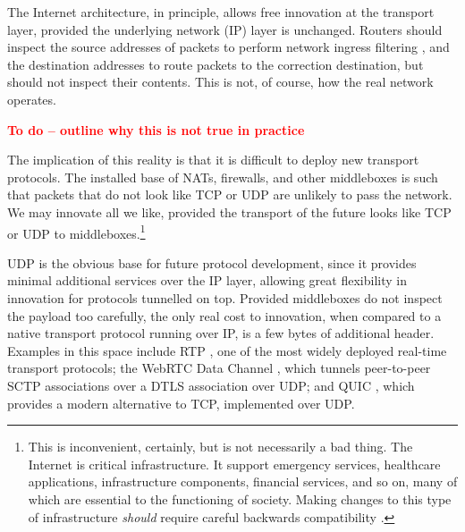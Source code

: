 \documentclass{sig-alternate-05-2015}
\newcommand{\todo}[1]{\textbf{\textcolor{red}{To do -- #1}}}
\begin{document}
The Internet architecture, in principle, allows free innovation at the
transport layer, provided the underlying network (IP) layer is unchanged.  
Routers should inspect the source addresses of packets to perform network
ingress filtering \cite{rfc:2827}, and the destination addresses to route
packets to the correction destination, but should not inspect their
contents. This is not, of course, how the real network operates. 

\todo{outline why this is not true in practice}

The implication of this reality is that it is difficult to deploy new 
transport protocols. The installed base of NATs, firewalls, and other
middleboxes is such that packets that do not look like TCP or UDP are
unlikely to pass the network. We may innovate all we like, provided the
transport of the future looks like TCP or UDP to middleboxes.\footnote{
  This is inconvenient, certainly, but is not necessarily a bad thing. 
  The Internet is critical infrastructure. It support emergency services, 
  healthcare applications, infrastructure components, financial services, 
  and so on, many of which are essential to the functioning of society. 
  Making changes to this type of infrastructure \emph{should} require 
  careful backwards compatibility \cite{mcquistin:2015:reinterpreting}.
}

UDP is the obvious base for future protocol development, since it provides
minimal additional services over the IP layer, allowing great flexibility
in innovation for protocols tunnelled on top. Provided middleboxes do not
inspect the payload too carefully, the only real cost to innovation, when
compared to a native transport protocol running over IP, is a few bytes of
additional header. Examples in this space include RTP \cite{rfc:3550}, one
of the most widely deployed real-time transport protocols; the WebRTC Data
Channel \cite{draft-ietf-rtcweb-data-channel-13}, which tunnels
peer-to-peer SCTP associations over a DTLS association over UDP; and QUIC
\cite{draft-tsvwg-quic-protocol-02}, which provides a modern alternative 
to TCP, implemented over UDP. 
\end{document}
